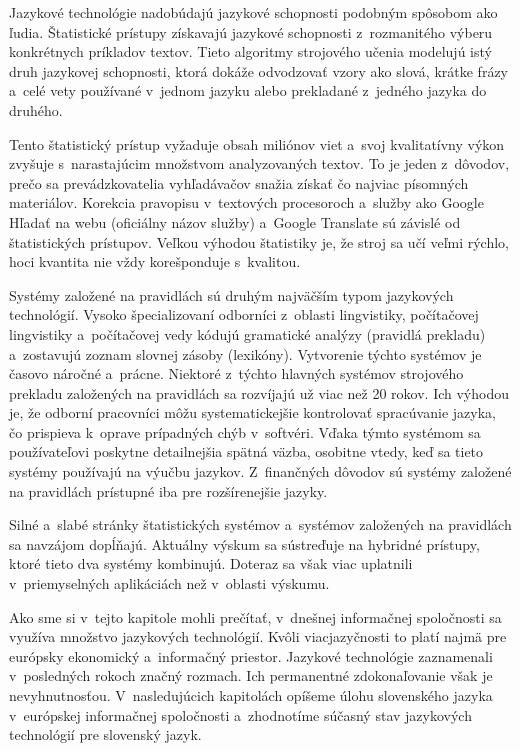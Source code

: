 \begin{multicols}{2}

Jazykové technológie nadobúdajú jazykové schopnosti podobným spôsobom ako ľudia. Štatistické prístupy získavajú jazykové schopnosti z~rozmanitého výberu konkrétnych príkladov textov. Tieto algoritmy strojového učenia modelujú istý druh jazykovej schopnosti, ktorá dokáže odvodzovať vzory ako slová, krátke frázy a~celé vety používané v~jednom jazyku alebo prekladané z~jedného jazyka do druhého.  

Tento štatistický prístup vyžaduje obsah miliónov viet a~svoj kvalitatívny výkon zvyšuje s~narastajúcim množstvom analyzovaných textov. To je jeden z~dôvodov, prečo sa prevádzkovatelia vyhľadávačov snažia získať čo najviac písomných materiálov. Korekcia pravopisu v~textových procesoroch a~služby ako Google Hľadať na webu (oficiálny názov služby) a~Google Translate sú závislé od štatistických prístupov. Veľkou výhodou štatistiky je, že stroj sa učí veľmi rýchlo, hoci kvantita nie vždy korešponduje s~kvalitou.

Systémy založené na pravidlách sú druhým najväčším typom jazykových technológií. Vysoko špecializovaní odborníci z~oblasti lingvistiky, počítačovej lingvistiky a~počítačovej vedy kódujú gramatické analýzy (pravidlá prekladu) a~zostavujú zoznam slovnej zásoby (lexikóny). Vytvorenie týchto systémov je časovo náročné a~prácne. Niektoré z~týchto hlavných systémov strojového prekladu založených na pravidlách sa  rozvíjajú už viac než 20 rokov. Ich výhodou je, že odborní pracovníci môžu systematickejšie kontrolovať spracúvanie jazyka, čo prispieva k~oprave prípadných chýb v~softvéri. Vďaka týmto systémom sa používateľovi poskytne detailnejšia spätná väzba, osobitne vtedy, keď sa tieto systémy používajú na výučbu jazykov. Z~finančných dôvodov sú systémy založené na pravidlách prístupné iba pre rozšírenejšie jazyky.

Silné a~slabé stránky štatistických systémov a~systémov založených na pravidlách sa navzájom dopĺňajú. Aktuálny výskum sa sústreďuje na hybridné prístupy, ktoré tieto dva systémy kombinujú. Doteraz sa však viac uplatnili v~priemyselných aplikáciách než v~oblasti výskumu.

Ako sme si v~tejto kapitole mohli prečítať, v~dnešnej informačnej spoločnosti sa využíva množstvo jazykových technológií. Kvôli viacjazyčnosti to platí najmä pre európsky ekonomický a~informačný priestor. Jazykové technológie zaznamenali v~posledných rokoch značný rozmach. Ich permanentné zdokonaľovanie však je nevyhnutnosťou. V~nasledujúcich kapitolách opíšeme úlohu slovenského jazyka v~európskej informačnej spoločnosti a~zhodnotíme súčasný stav jazykových technológií pre slovenský jazyk.

\end{multicols}

